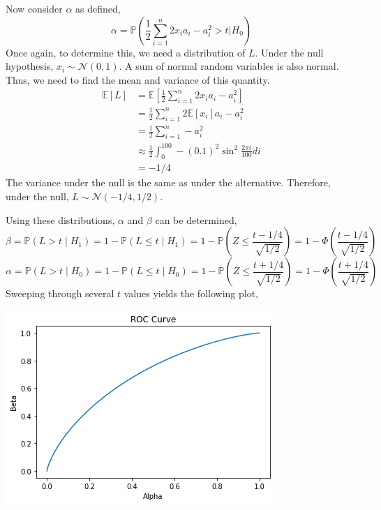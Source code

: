 \documentclass[12pt,twoside]{article}
\begin{document}
\begin{problems}
\begin{problemparts}
Now consider $\alpha$ as defined,
$$ \alpha = \mathbb{P}\left(\frac{1}{2}\sum_{i = 1}^n 2 x_i a_i - a_i^2 > t |
H_0 \right) $$
Once again, to determine this, we need a distribution of $L$. Under the
null hypothesis, $x_i \sim \mathcal{N}(0, 1)$. A sum of normal random
variables is also normal. Thus, we need to find the mean and variance of this
quantity.
\begin{align*}
    \mathbb{E}[L] &= \mathbb{E}\left[\frac{1}{2}\sum_{i = 1}^n 2 x_i a_i -
    a_i^2\right] \\
    &= \frac{1}{2}\sum_{i = 1}^n 2 \mathbb{E}[x_i] a_i - a_i^2 \\
    &= \frac{1}{2}\sum_{i = 1}^n -a_i^2 \\
    &\approx \frac{1}{2}\int_{0}^{100} -(0.1)^2 \sin^2 \frac{2 \pi i}{100} di
    \\
    &= -1/4
\end{align*}
The variance under the null is the same as under the alternative. Therefore,
under the null, $L \sim \mathcal{N}(-1/4, 1/2)$.

Using these distributions, $\alpha$ and $\beta$ can be determined,
$$ \beta = \mathbb{P}(L > t \mid H_1) = 1 - \mathbb{P}(L \leq t \mid H_1) = 1
- \mathbb{P}\left(Z \leq \frac{t - 1/4}{\sqrt{1/2}}\right) = 1 -
\Phi\left(\frac{t - 1/4}{\sqrt{1/2}}\right) $$
$$ \alpha = \mathbb{P}(L > t \mid H_0) = 1 - \mathbb{P}(L \leq t \mid H_0) = 1
- \mathbb{P}\left(Z \leq \frac{t + 1/4}{\sqrt{1/2}}\right) = 1 -
\Phi\left(\frac{t + 1/4}{\sqrt{1/2}}\right) $$
Sweeping through several $t$ values yields the following plot,
\begin{center}
    \includegraphics[scale=0.75]{ROCCurve.png}
\end{center}

\end{problemparts}


\end{problems}
\end{document}

